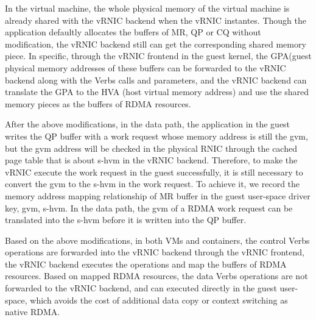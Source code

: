 In the virtual machine, the whole physical memory of the virtual machine is already shared with the vRNIC backend when the vRNIC instantes. Though the application defaultly allocates the buffers of MR, QP or CQ without modification, the vRNIC backend still can get the corresponding shared memory piece. In specific, through the vRNIC frontend in the guest kernel, the GPA(guest physical memory addresses of these buffers can be forwarded to the vRNIC backend along with the Verbs calls and parameters, and the vRNIC backend can translate the GPA to the HVA (host virtual memory address) and use the shared memory pieces as the buffers of RDMA resources.

After the above modifications, in the data path, the application in the guest writes the QP buffer with a work request whose memory address is still the gvm, but the gvm address will be checked in the physical RNIC through the cached page table that is about s-hvm in the vRNIC backend. Therefore, to make the vRNIC execute the work request in the guest successfully, it is still necessary to convert the gvm to the s-hvm 
in the work request. To achieve it, we record the memory address mapping relationship of MR buffer in the guest user-space driver {key, gvm, s-hvm}. In the data path, the gvm of a RDMA work request can be translated into the s-hvm before it is written into the QP buffer.

Based on the above modifications, in both VMs and containers, the control Verbs operations are forwarded into the vRNIC backend through the vRNIC frontend, the vRNIC backend executes the operations and map the buffers of RDMA resources. Based on mapped RDMA resources, the data Verbs operations are not forwarded to the vRNIC backend, and can executed directly in the guest user-space, which avoids the cost of additional data copy or context switching as native RDMA.

